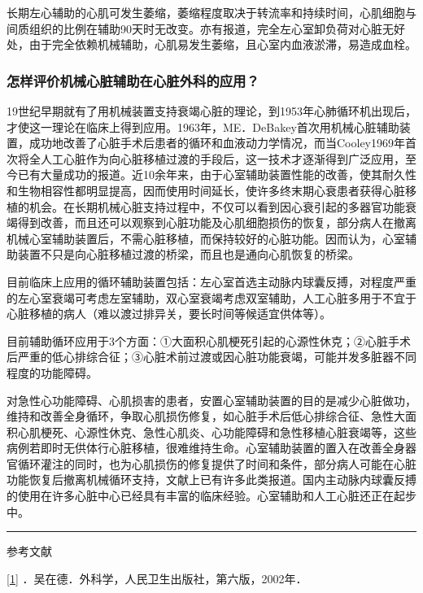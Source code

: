 长期左心辅助的心肌可发生萎缩，萎缩程度取决于转流率和持续时间，心肌细胞与间质组织的比例在辅助90天时无改变。亦有报道，完全左心室卸负荷对心脏无好处，由于完全依赖机械辅助，心肌易发生萎缩，且心室内血液淤滞，易造成血栓。

\subsubsection{怎样评价机械心脏辅助在心脏外科的应用？}

19世纪早期就有了用机械装置支持衰竭心脏的理论，到1953年心肺循环机出现后，才使这一理论在临床上得到应用。1963年，ME．DeBakey首次用机械心脏辅助装置，成功地改善了心脏手术后患者的循环和血液动力学情况，而当Cooley1969年首次将全人工心脏作为向心脏移植过渡的手段后，这一技术才逐渐得到广泛应用，至今已有大量成功的报道。近10余年来，由于心室辅助装置性能的改善，使其耐久性和生物相容性都明显提高，因而使用时间延长，使许多终末期心衰患者获得心脏移植的机会。在长期机械心脏支持过程中，不仅可以看到因心衰引起的多器官功能衰竭得到改善，而且还可以观察到心脏功能及心肌细胞损伤的恢复，部分病人在撤离机械心室辅助装置后，不需心脏移植，而保持较好的心脏功能。因而认为，心室辅助装置不只是向心脏移植过渡的桥梁，而且也是通向心肌恢复的桥梁。

目前临床上应用的循环辅助装置包括：左心室首选主动脉内球囊反搏，对程度严重的左心室衰竭可考虑左室辅助，双心室衰竭考虑双室辅助，人工心脏多用于不宜于心脏移植的病人（难以渡过排异关，要长时间等候适宜供体等）。

目前辅助循环应用于3个方面：①大面积心肌梗死引起的心源性休克；②心脏手术后严重的低心排综合征；③心脏术前过渡或因心脏功能衰竭，可能并发多脏器不同程度的功能障碍。

对急性心功能障碍、心肌损害的患者，安置心室辅助装置的目的是减少心脏做功，维持和改善全身循环，争取心肌损伤修复，如心脏手术后低心排综合征、急性大面积心肌梗死、心源性休克、急性心肌炎、心功能障碍和急性移植心脏衰竭等，这些病例若即时无供体行心脏移植，很难维持生命。心室辅助装置的置入在改善全身器官循环灌注的同时，也为心肌损伤的修复提供了时间和条件，部分病人可能在心脏功能恢复后撤离机械循环支持，文献上已有许多此类报道。国内主动脉内球囊反搏的使用在许多心脏中心已经具有丰富的临床经验。心室辅助和人工心脏还正在起步中。

\begin{center}\rule{0.5\linewidth}{\linethickness}\end{center}

参考文献

\protect\hyperlink{text00008.htmlux5cux23ch1-7-back}{{[}1{]}}
．吴在德．外科学，人民卫生出版社，第六版，2002年．

